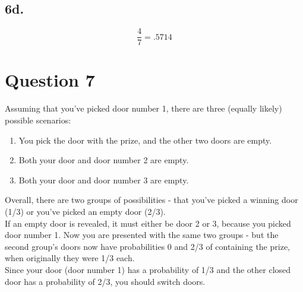 \documentclass{article}
\begin{document}
\subsection{6d.}
\begin{equation}
\frac{4}{7} = .5714
\end{equation}
\section{Question 7}

Assuming that you've picked door number 1, there are three (equally likely) possible scenarios:

\begin{enumerate}
\item You pick the door with the prize, and the other two doors are empty.
\item Both your door and door number 2 are empty.
\item Both your door and door number 3 are empty.
\end{enumerate}

Overall, there are two groups of possibilities - that you've picked a winning door (1/3) or you've picked an empty door (2/3).\\

If an empty door is revealed, it must either be door 2 or 3, because you picked door number 1. Now you are presented with the same two groups - but the second group's doors now have probabilities 0 and 2/3 of containing the prize, when originally they were 1/3 each.\\

Since your door (door number 1) has a probability of 1/3 and the other closed door has a probability of 2/3, you should switch doors.
\end{document}
